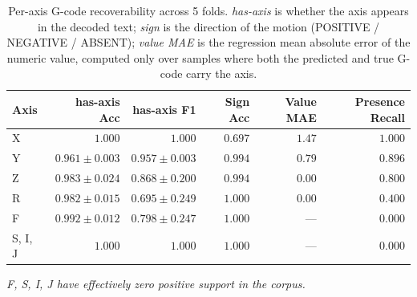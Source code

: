 \begin{table}[h]
\centering
\caption{Per-axis G-code recoverability across 5 folds. \emph{has-axis} is whether the axis appears in the decoded text; \emph{sign} is the direction of the motion (POSITIVE / NEGATIVE / ABSENT); \emph{value MAE} is the regression mean absolute error of the numeric value, computed only over samples where both the predicted and true G-code carry the axis.}
\label{tab:per_axis}
\begin{tabular}{l r r r r r}
\toprule
Axis & has-axis Acc & has-axis F1 & Sign Acc & Value MAE & Presence Recall \\
\midrule
X & $1.000$           & $1.000$           & $0.697$ & $1.47$ & $1.000$ \\
Y & $0.961 \pm 0.003$ & $0.957 \pm 0.003$ & $0.994$ & $0.79$ & $0.896$ \\
Z & $0.983 \pm 0.024$ & $0.868 \pm 0.200$ & $0.994$ & $0.00$ & $0.800$ \\
R & $0.982 \pm 0.015$ & $0.695 \pm 0.249$ & $1.000$ & $0.00$ & $0.400$ \\
F & $0.992 \pm 0.012$ & $0.798 \pm 0.247$ & $1.000$ & ---    & $0.000$ \\
S, I, J & $1.000$       & $1.000$            & $1.000$ & ---    & $0.000$ \\
\bottomrule
\end{tabular}
\par\smallskip
\footnotesize\textit{F, S, I, J have effectively zero positive support in the corpus.}
\end{table}
